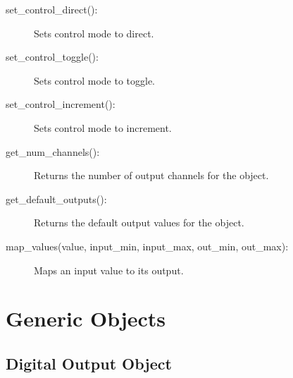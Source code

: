 \documentclass[letterpaper,10pt,english]{sphinxmanual}
\begin{document}
\begin{fulllineitems}
\begin{description}
\item[{set\_control\_direct():}] \leavevmode
\sphinxAtStartPar
Sets control mode to direct.

\item[{set\_control\_toggle():}] \leavevmode
\sphinxAtStartPar
Sets control mode to toggle.

\item[{set\_control\_increment():}] \leavevmode
\sphinxAtStartPar
Sets control mode to increment.

\item[{get\_num\_channels():}] \leavevmode
\sphinxAtStartPar
Returns the number of output channels for the object.

\item[{get\_default\_outputs():}] \leavevmode
\sphinxAtStartPar
Returns the default output values for the object.

\item[{map\_values(value, input\_min, input\_max, out\_min, out\_max):}] \leavevmode
\sphinxAtStartPar
Maps an input value to its output.

\end{description}

\end{fulllineitems}



\section{Generic Objects}
\label{\detokenize{generic:generic-objects}}\label{\detokenize{generic::doc}}

\subsection{Digital Output Object}
\label{\detokenize{generic:module-DigitalOutputObject}}\label{\detokenize{generic:digital-output-object}}
\end{document}
